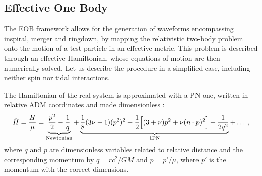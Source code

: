 \documentclass[main.tex]{subfiles}
\begin{document}
\subsection{Effective One Body} \label{sec:eob}

The \ac{EOB} framework allows for the generation of waveforms encompassing inspiral, merger and ringdown, by mapping the relativistic two-body problem onto the motion of a test particle in an effective metric. 
This problem is described through an effective Hamiltonian, whose equations of motion are then numerically solved. 
Let us describe the procedure in a simplified case, including neither spin nor tidal interactions. 

The Hamiltonian of the real system is approximated with a \ac{PN} one, written in relative \ac{ADM} coordinates and made dimensionless \cite[eqs.\ 4--5]{damourGeneralRelativisticTwo2014}: 
%
\begin{align}
\hat{H} = \frac{H}{\mu } = \underbrace{\frac{p^2}{2} - \frac{1}{q}}_{\text{Newtonian}} 
+ \underbrace{\frac{1}{8} (3 \nu -1 ) (p^2)^2 - \frac{1}{2} \qty[(3+\nu ) p^2 + \nu (n \cdot p)^2] + \frac{1}{2 q^2}}_{\text{1PN}} + \dots
\,,
\end{align}
% 
where \(q\) and \(p\) are dimensionless variables related to relative distance and the corresponding
momentum by \(q = r c^2 / GM\) and \(p = p' / \mu \), where \(p'\) is the momentum with the correct dimensions.  
\end{document}
